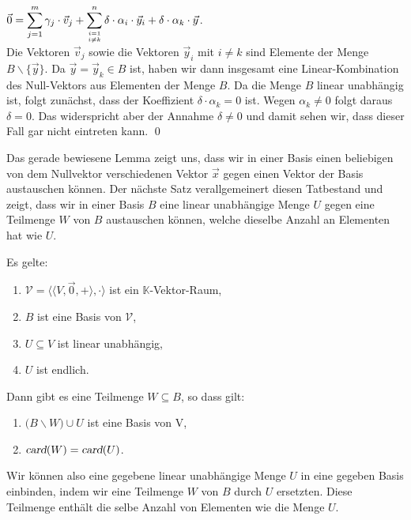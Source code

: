 \begin{enumerate}
\begin{enumerate}
            $\displaystyle\vec{0} = \sum\limits_{j=1}^m \gamma_j \cdot \vec{v}_j + \sum\limits_{i=1 \atop i \not= k}^n \delta\cdot \alpha_i \cdot \vec{y}_i + \delta\cdot \alpha_k \cdot \vec{y}$.
            \\[0.2cm]
            Die Vektoren $\vec{v}_j$ sowie die Vektoren $\vec{y}_i$ mit $i \not= k$ sind Elemente der Menge
            $B \backslash \{ \vec{y} \}$.  Da $\vec{y} = \vec{y}_k \in B$ ist,  haben wir dann insgesamt eine Linear-Kombination des Null-Vektors aus
            Elementen der Menge $B$.  Da die Menge $B$ linear unabh\"{a}ngig ist, folgt zun\"{a}chst, dass der Koeffizient
            $\delta\cdot \alpha_k = 0$  ist.  Wegen $\alpha_k \not= 0$ folgt daraus $\delta = 0$.  Das widerspricht aber der Annahme $\delta \not= 0$
            und damit sehen wir, dass dieser Fall gar nicht eintreten kann.
            \qed
      \end{enumerate}
\end{enumerate}

Das gerade bewiesene Lemma zeigt uns, dass wir in einer Basis einen beliebigen von dem Nullvektor
verschiedenen Vektor $\vec{x}$ 
gegen einen Vektor der Basis austauschen k\"{o}nnen.  Der n\"{a}chste Satz verallgemeinert diesen Tatbestand
und zeigt, dass wir 
in einer Basis $B$ eine linear unabh\"{a}ngige Menge $U$ gegen eine Teilmenge $W$ von $B$ austauschen
k\"{o}nnen, welche dieselbe Anzahl an Elementen hat wie $U$.

\begin{Satz}
  Es gelte:
  \begin{enumerate}
  \item $\mathcal{V} = \bigl\langle \langle V, \vec{0}, + \rangle, \cdot \bigr\rangle$ ist ein $\mathbb{K}$-Vektor-Raum,
  \item $B$ ist eine Basis von $\mathcal{V}$,
  \item $U \subseteq V$ ist linear unabh\"{a}ngig,
  \item $U$ ist endlich. 
  \end{enumerate}
  Dann gibt es eine Teilmenge $W \subseteq B$, so dass gilt:
  \begin{enumerate}
  \item $\bigl(B \backslash W\bigr) \cup U$ ist eine Basis von V,
  \item $\textsl{card}(W) = \textsl{card}(U)$.
  \end{enumerate}
  Wir k\"{o}nnen also eine gegebene linear unabh\"{a}ngige Menge $U$ in eine gegeben Basis einbinden,
  indem wir eine Teilmenge $W$ von $B$ durch $U$ ersetzten.  Diese Teilmenge enth\"{a}lt die selbe
  Anzahl von Elementen wie die Menge $U$.
\end{Satz}

